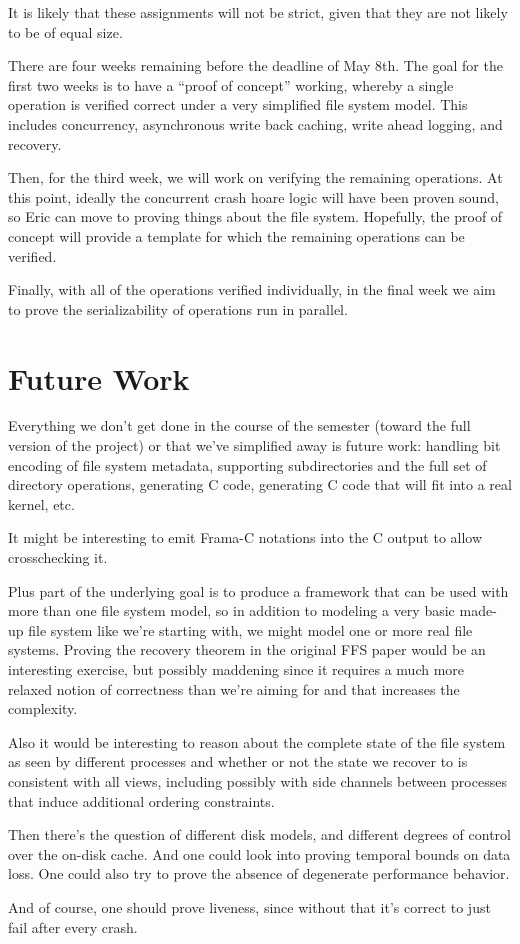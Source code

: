 \documentclass[11pt, twocolumn, letterpaper]{article}
\begin{document}
It is likely that these assignments will not be strict, given that they are not
likely to be of equal size.

There are four weeks remaining before the deadline of May 8th. The goal for the
first two weeks is to have a ``proof of concept'' working, whereby a single
operation is verified correct under a very simplified file system model. This
includes concurrency, asynchronous write back caching, write ahead logging, and
recovery.

Then, for the third week, we will work on verifying the remaining operations.
At this point, ideally the concurrent crash hoare logic will have been proven
sound, so Eric can move to proving things about the file system. Hopefully, the
proof of concept will provide a template for which the remaining operations can
be verified.

Finally, with all of the operations verified individually, in the final week we
aim to prove the serializability of operations run in parallel.

\section{Future Work}


Everything we don't get done in the course of the semester (toward the
full version of the project) or that we've simplified away is future
work: handling bit encoding of file system metadata, supporting
subdirectories and the full set of directory operations, generating C
code, generating C code that will fit into a real kernel, etc.

It might be interesting to emit Frama-C notations into the C output to
allow crosschecking it.

Plus part of the underlying goal is to produce a framework that can be
used with more than one file system model, so in addition to modeling
a very basic made-up file system like we're starting with, we might
model one or more real file systems.
Proving the recovery theorem in the original FFS paper would be an
interesting exercise, but possibly maddening since it requires a much
more relaxed notion of correctness than we're aiming for and that
increases the complexity.

Also it would be interesting to reason about the complete state of the
file system as seen by different processes and whether or not the
state we recover to is consistent with all views, including possibly
with side channels between processes that induce additional ordering
constraints.

Then there's the question of different disk models, and different
degrees of control over the on-disk cache.
And one could look into proving temporal bounds on data loss.
One could also try to prove the absence of degenerate performance
behavior.

And of course, one should prove liveness, since without that it's
correct to just fail after every crash.

%
%
\end{document}
